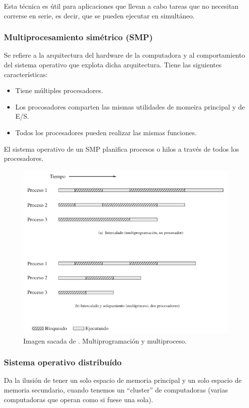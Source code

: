 \documentclass[12pt]{article}
\begin{document}
  Esta técnica es útil para aplicaciones que llevan a cabo tareas que no necesitan correrse en serie, es decir, que se pueden ejecutar en simultáneo.

  \subsubsection{Multiprocesamiento simétrico (SMP)}
  Se refiere a la arquitectura del hardware de la computadora y al comportamiento del sistema operativo que explota dicha arquitectura. Tiene las siguientes características:
  \begin{itemize}
    \item Tiene múltiples procesadores.

    \item Los procosadores comparten las mismas utilidades de momeira principal y de E/S.

    \item Todos los procesadores pueden realizar las mismas funciones.
  \end{itemize}

  El sistema operativo de un SMP planifica procesos o hilos a través de todos los procesadores.
  \begin{figure}[H]
    \centering
    \includegraphics[width=0.7\linewidth]{imagenes/smp-vs-no-smp.png}
    \caption{Imagen sacada de \parencite{sostallings}. Multiprogramación y multiproceso.}
    \label{fig:smp}
  \end{figure}
  
  \subsubsection{Sistema operativo distribuído}
  Da la ilusión de tener un solo espacio de memoria principal y un solo espacio de memoria secundario, cuando tenemos un ``cluster'' de computadoras (varias computadoras que operan como si fuese una sola).
\end{document}
